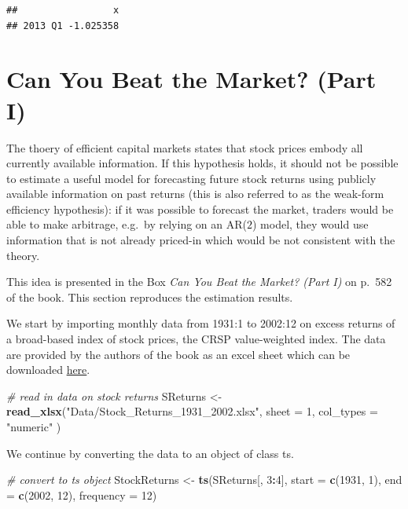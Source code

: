 \documentclass[]{book}
\newenvironment{Shaded}{\begin{snugshade}}{\end{snugshade}}
\newcommand{\KeywordTok}[1]{\textcolor[rgb]{0.13,0.29,0.53}{\textbf{#1}}}
\newcommand{\DataTypeTok}[1]{\textcolor[rgb]{0.13,0.29,0.53}{#1}}
\newcommand{\DecValTok}[1]{\textcolor[rgb]{0.00,0.00,0.81}{#1}}
\newcommand{\StringTok}[1]{\textcolor[rgb]{0.31,0.60,0.02}{#1}}
\newcommand{\CommentTok}[1]{\textcolor[rgb]{0.56,0.35,0.01}{\textit{#1}}}
\newcommand{\OperatorTok}[1]{\textcolor[rgb]{0.81,0.36,0.00}{\textbf{#1}}}
\newcommand{\NormalTok}[1]{#1}
\theoremstyle{definition}
\theoremstyle{definition}
\theoremstyle{definition}
\theoremstyle{remark}
\begin{document}
\begin{verbatim}
##                 x
## 2013 Q1 -1.025358
\end{verbatim}

\section{Can You Beat the Market? (Part
I)}\label{can-you-beat-the-market-part-i}

The thoery of efficient capital markets states that stock prices embody
all currently available information. If this hypothesis holds, it should
not be possible to estimate a useful model for forecasting future stock
returns using publicly available information on past returns (this is
also referred to as the weak-form efficiency hypothesis): if it was
possible to forecast the market, traders would be able to make
arbitrage, e.g.~by relying on an AR(\(2\)) model, they would use
information that is not already priced-in which would be not consistent
with the theory.

This idea is presented in the Box \emph{Can You Beat the Market? (Part
I)} on p.~582 of the book. This section reproduces the estimation
results.

We start by importing monthly data from 1931:1 to 2002:12 on excess
returns of a broad-based index of stock prices, the CRSP value-weighted
index. The data are provided by the authors of the book as an excel
sheet which can be downloaded
\href{http://wps.aw.com/wps/media/objects/11422/11696965/data3eu/Stock_Returns_1931_2002.xlsx}{here}.

\begin{Shaded}
\begin{Highlighting}[]
\CommentTok{# read in data on stock returns}
\NormalTok{SReturns <-}\StringTok{ }\KeywordTok{read_xlsx}\NormalTok{(}\StringTok{"Data/Stock_Returns_1931_2002.xlsx"}\NormalTok{,}
                      \DataTypeTok{sheet =} \DecValTok{1}\NormalTok{,}
                      \DataTypeTok{col_types =} \StringTok{"numeric"}
\NormalTok{                      )}
\end{Highlighting}
\end{Shaded}

We continue by converting the data to an object of class ts.

\begin{Shaded}
\begin{Highlighting}[]
\CommentTok{# convert to ts object}
\NormalTok{StockReturns <-}\StringTok{ }\KeywordTok{ts}\NormalTok{(SReturns[, }\DecValTok{3}\OperatorTok{:}\DecValTok{4}\NormalTok{], }
        \DataTypeTok{start =} \KeywordTok{c}\NormalTok{(}\DecValTok{1931}\NormalTok{, }\DecValTok{1}\NormalTok{), }
        \DataTypeTok{end =} \KeywordTok{c}\NormalTok{(}\DecValTok{2002}\NormalTok{, }\DecValTok{12}\NormalTok{), }
        \DataTypeTok{frequency =} \DecValTok{12}\NormalTok{)}
\end{Highlighting}
\end{Shaded}
\end{document}
